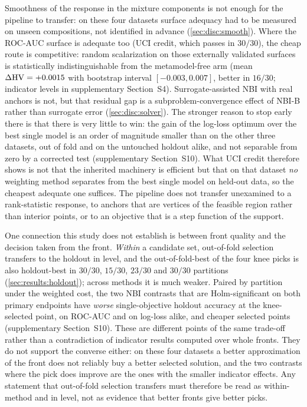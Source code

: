 Smoothness of the response in the mixture components is not enough for the pipeline to transfer: on these four
datasets surface adequacy had to be measured on unseen compositions, not identified in advance (\cref{sec:disc:smooth}).
Where the ROC-AUC surface is adequate too (UCI credit, which passes in $30/30$), the cheap route is competitive:
random scalarization on those externally validated surfaces is statistically indistinguishable from the
metamodel-free arm (mean $\Delta\mathrm{HV} = +0.0015$ with bootstrap interval $[-0.003, 0.007]$, better in $16/30$;
indicator levels in supplementary Section~S4). Surrogate-assisted NBI with real anchors is not, but that
residual gap is a subproblem-convergence effect of NBI-B rather than surrogate error
(\cref{sec:disc:solver}). The stronger reason to stop early there is that there is very little to win: the gain of the
log-loss optimum over the best single model is an order of magnitude smaller than on the other three datasets, out of
fold and on the untouched holdout alike, and not separable from zero by a corrected test (supplementary
Section~S10). What UCI credit therefore shows is not that the inherited machinery is efficient but that on that
dataset \emph{no} weighting method separates from the best single model on held-out data, so the cheapest adequate
one suffices. The pipeline does not
transfer unexamined to a rank-statistic response, to anchors that are vertices of the feasible region rather than
interior points, or to an objective that is a step function of the support.

One connection this study does not establish is between front quality and the decision taken from the front.
\emph{Within} a candidate set, out-of-fold selection transfers to the holdout in level, and the out-of-fold-best of
the four knee picks is also holdout-best in $30/30$, $15/30$, $23/30$ and $30/30$ partitions
(\cref{sec:results:holdout}); across methods it is much weaker. Paired by partition under the weighted cost, the two
NBI contrasts that are Holm-significant on both primary endpoints have \emph{worse} single-objective holdout accuracy at
the knee-selected point, on ROC-AUC and on log-loss alike, and cheaper selected points (supplementary Section~S10).
These are different points of the same trade-off rather than a contradiction of indicator results computed over whole
fronts. They do not support the converse either: on these four datasets a better approximation of the front does not
reliably buy a better selected solution, and the two contrasts where the pick does improve are the ones with the
smaller indicator effects. Any statement that out-of-fold selection transfers must therefore be read as within-method
and in level, not as evidence that better fronts give better picks.
